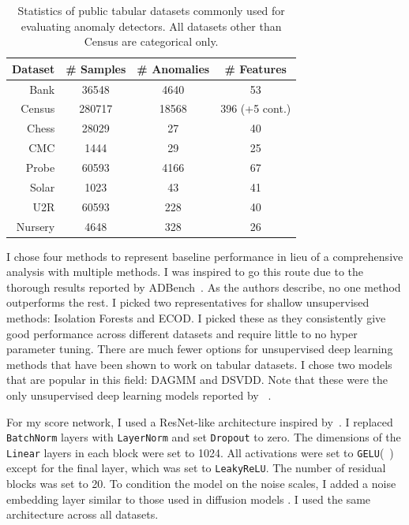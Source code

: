\begin{table}
    \centering
    \small
    \begin{tabular}{rccc}
      \toprule %
      \bfseries Dataset & \bfseries \# Samples & \bfseries \# Anomalies & \bfseries \# Features \\
      \midrule 
      Bank & 36548 & 4640 & 53 \\
      Census & 280717 & 18568 & 396 (+5 cont.)\\
      Chess & 28029 & 27 & 40 \\
      CMC & 1444 & 29 & 25 \\
      Probe & 60593 & 4166 & 67 \\
      Solar & 1023 & 43 & 41 \\
      U2R & 60593 & 228 & 40 \\
      Nursery & 4648 & 328 & 26 \\
      \bottomrule
    \end{tabular}
    \caption{Statistics of public tabular datasets commonly used for evaluating anomaly detectors. All datasets other than Census are categorical only.}\label{tab:data}
\end{table}

I chose four methods to represent baseline performance in lieu of a comprehensive analysis with multiple methods. I was inspired to go this route due to the thorough results reported by ADBench~\cite{han2022adbench}. As the authors describe, no one method outperforms the rest. I picked two representatives for shallow unsupervised methods: Isolation Forests and ECOD. I picked these as they consistently give good performance across different datasets and require little to no hyper parameter tuning. There are much fewer options for unsupervised deep learning methods that have been shown to work on tabular datasets. I chose two models that are popular in this field: DAGMM and DSVDD. Note that these were the only unsupervised deep learning models reported by ~\cite{han2022adbench}.

For my score network, I used a ResNet-like architecture inspired by~\cite{gorishniy2021revisiting}. I replaced \texttt{BatchNorm} layers with \texttt{LayerNorm} and set \texttt{Dropout} to zero. The dimensions of the \texttt{Linear} layers in each block were set to 1024. All activations were set to \texttt{GELU}(~\cite{gelu}) except for the final layer, which was set to \texttt{LeakyReLU}. The number of residual blocks was set to 20. 
To condition the model on the noise scales, I added a noise embedding layer similar to those used in diffusion models \cite{song2020score}. I used the same architecture across all datasets.

